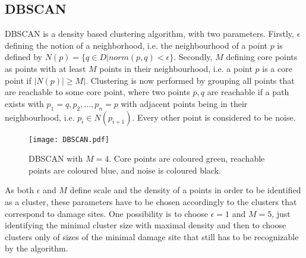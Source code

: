 \subsection{DBSCAN}
DBSCAN is a density based clustering algorithm, with two parameters. Firstly, $\epsilon$ defining the notion of a neighborhood, i.e. the neighbourhood of a point $p$ is defined by $N(p) = \{ q \in D | norm(p,q)<\epsilon\}$. Secondly, $M$ defining core points as points with at least $M$ points in their neighbourhood, i.e. a point $p$ is a core point if $|N(p)| \geq M|$. Clustering is now performed by grouping all points that are reachable to some core point, where two points $p,q$ are reachable if a path exists with $p_1=q,p_2,\dots,p_n=p$ with adjacent points being in their neighbourhood, i.e. $p_i\in N(p_{i+1})$. Every other point is considered to be noise. \\



\begin{figure}[H]
\centering
\texttt{[image: DBSCAN.pdf]}
\caption{DBSCAN with $M=4$. Core points are coloured green, reachable points are coloured blue, and noise is coloured black.}
\end{figure}

As both $\epsilon$ and $M$ define scale and the density of a points in order to be identified as a cluster, these parameters have to be chosen accordingly to the clusters that correspond to damage sites. One possibility is to choose $\epsilon=1$ and $M=5$, just identifying the minimal cluster size with maximal density and then to choose clusters only of sizes of the minimal damage site that still has to be recognizable by the algorithm. 

